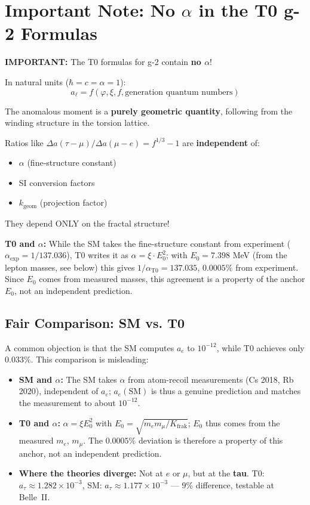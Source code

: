	\section{Important Note: No $\alpha$ in the T0 g-2 Formulas}
	
	\textbf{IMPORTANT:}
	The T0 formulas for g-2 contain \textbf{no $\alpha$}!
	
	In natural units ($\hbar = c = \alpha = 1$):
	\[ a_\ell = f(\varphi, \xi, f, \text{generation quantum numbers}) \]
	
	The anomalous moment is a \textbf{purely geometric quantity},
	following from the winding structure in the torsion lattice.
	
	Ratios like $\Delta a(\tau-\mu)/\Delta a(\mu-e) = f^{1/3} - 1$ are
	\textbf{independent} of:
	\begin{itemize}
		\item $\alpha$ (fine-structure constant)
		\item SI conversion factors
		\item $k_{\text{geom}}$ (projection factor)
	\end{itemize}
	
	They depend ONLY on the fractal structure!
	
	\textbf{T0 and $\alpha$:} While the SM takes the fine-structure constant from experiment ($\alpha_\text{exp} = 1/137.036$), T0 writes it as $\alpha = \xi \cdot E_0^2$; with $E_0 = 7.398$ MeV (from the lepton masses, see below) this gives $1/\alpha_\text{T0} = 137.035$, $0.0005\%$ from experiment. Since $E_0$ comes from measured masses, this agreement is a property of the anchor $E_0$, not an independent prediction.
	
	\subsection{Fair Comparison: SM vs. T0}
	
	A common objection is that the SM computes $a_e$ to $10^{-12}$, while T0 achieves only $0.033\%$. This comparison is misleading:
	
	\begin{itemize}
		\item \textbf{SM and $\alpha$:} The SM takes $\alpha$ from atom-recoil measurements (Cs 2018, Rb 2020), independent of $a_e$; $a_e(\text{SM})$ is thus a genuine prediction and matches the measurement to about $10^{-12}$.
		\item \textbf{T0 and $\alpha$:} $\alpha = \xi E_0^2$ with $E_0 = \sqrt{m_e m_\mu/K_\text{frak}}$; $E_0$ thus comes from the measured $m_e$, $m_\mu$. The $0.0005\%$ deviation is therefore a property of this anchor, not an independent prediction.
		\item \textbf{Where the theories diverge:} Not at $e$ or $\mu$, but at the \textbf{tau}. T0: $a_\tau \approx 1.282 \times 10^{-3}$, SM: $a_\tau \approx 1.177 \times 10^{-3}$ --- $9\%$ difference, testable at Belle~II.
	\end{itemize}
	
